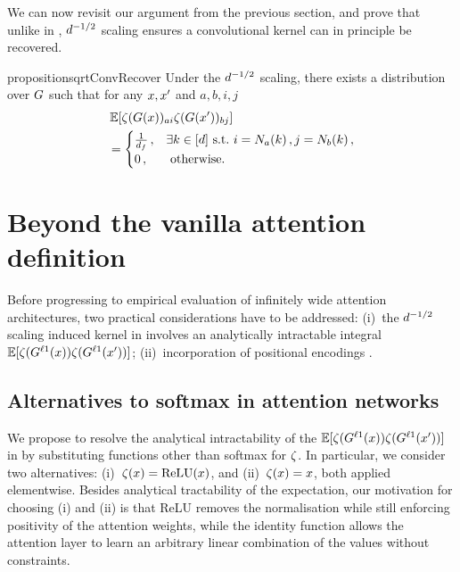 \documentclass{article}
\begin{document}
We can now revisit our argument from the previous section, and prove that unlike in , $d^{-1/2}$ scaling ensures a convolutional kernel can in principle be recovered.

\begin{restatable}{proposition}{sqrtConvRecover}
\label{prop:sqrt_scale_conv_recover}
    Under the $d^{-1/2}$ scaling, there exists a distribution over $G$ such that
    for any $x, x'$ and $a, b, i, j$
    \begin{align}
        &\operatorname*{\mathbb{E}} [
            \zeta(G(x))_{a i}
            \zeta(G(x'))_{b j}
        ]
        \nonumber
        \\
        &=
        \begin{cases}
            \frac{1}{d_f}\, , &  \exists k \in [d] \text{ s.t.\ } i = N_a(k) \, , j = N_b(k) \, ,  \\
            0 \, ,&  \text{ otherwise.}
        \end{cases}
    \end{align}
\end{restatable}



\section{Beyond the vanilla attention definition}\label{sect:beyon_vanilla_attn}

Before progressing to empirical evaluation of infinitely wide attention architectures,
two practical considerations have to be addressed: (i)~the $d^{-1/2}$ scaling induced kernel in  involves an analytically intractable integral $\operatorname*{\mathbb{E}} [\zeta(G^{\ell 1}(x)) \zeta(G^{\ell 1}(x'))]$; (ii)~incorporation of positional encodings \citep{gehring2017convolutional,vaswani2017attention}.

\subsection{Alternatives to softmax in attention networks}\label{sect:softmax_alternatives}

We propose to resolve the analytical intractability of the $\operatorname*{\mathbb{E}} [\zeta(G^{\ell 1}(x)) \zeta(G^{\ell 1}(x'))]$ in  by substituting functions other than softmax for $\zeta$.
In particular, we consider two alternatives:
(i)~$\zeta(x) = \text{ReLU}(x)$, and (ii)~$\zeta(x) = x$, both applied elementwise. Besides analytical tractability of the expectation, our motivation for choosing (i) and (ii) is that ReLU removes the normalisation while still enforcing positivity of the attention weights, while the identity function allows the attention layer to learn an arbitrary linear combination of the values without constraints.
\end{document}
